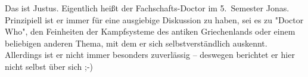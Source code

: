 \begin{multicols*}{2}
{Das ist Justus. Eigentlich heißt der Fachschafts-Doctor im 5.~Semester Jonas.
Prinzipiell ist er immer für eine ausgiebige Diskussion zu haben, sei es zu "Doctor Who", den Feinheiten der Kampfsysteme des antiken Griechenlands oder einem beliebigen anderen Thema, mit dem er sich selbstverständlich auskennt.
Allerdings ist er nicht immer besonders zuverlässig -- deswegen berichtet er hier nicht selbst über sich ;-)}



\end{multicols*}
